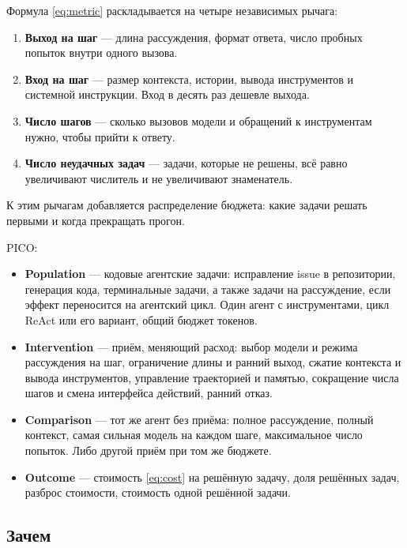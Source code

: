 \documentclass[11pt,a4paper]{article}
\begin{document}
Формула \eqref{eq:metric} раскладывается на четыре независимых рычага:

\begin{enumerate}
  \item \textbf{Выход на шаг} — длина рассуждения, формат ответа, число
        пробных попыток внутри одного вызова.
  \item \textbf{Вход на шаг} — размер контекста, истории, вывода инструментов
        и системной инструкции. Вход в десять раз дешевле выхода.
  \item \textbf{Число шагов} — сколько вызовов модели и обращений к
        инструментам нужно, чтобы прийти к ответу.
  \item \textbf{Число неудачных задач} — задачи, которые не решены, всё
        равно увеличивают числитель и не увеличивают знаменатель.
\end{enumerate}

К этим рычагам добавляется распределение бюджета: какие задачи решать
первыми и когда прекращать прогон.

PICO:

\begin{itemize}
  \item \textbf{Population} — кодовые агентские задачи: исправление issue в
        репозитории, генерация кода, терминальные задачи, а также задачи на
        рассуждение, если эффект переносится на агентский цикл. Один агент
        с инструментами, цикл ReAct или его вариант, общий бюджет токенов.
  \item \textbf{Intervention} — приём, меняющий расход: выбор модели и
        режима рассуждения на шаг, ограничение длины и ранний выход, сжатие
        контекста и вывода инструментов, управление траекторией и памятью,
        сокращение числа шагов и смена интерфейса действий, ранний отказ.
  \item \textbf{Comparison} — тот же агент без приёма: полное рассуждение,
        полный контекст, самая сильная модель на каждом шаге, максимальное
        число попыток. Либо другой приём при том же бюджете.
  \item \textbf{Outcome} — стоимость \eqref{eq:cost} на решённую задачу,
        доля решённых задач, разброс стоимости, стоимость одной решённой
        задачи.
\end{itemize}

\subsection{Зачем}
\end{document}
